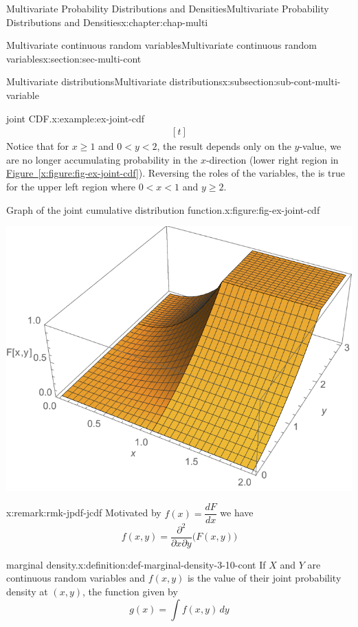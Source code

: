 \documentclass[oneside,10pt,]{book}
\newcommand{\xreffont}{\relax}
\numberwithin{equation}{section}
\newcommand{\lt}{<}
\begin{document}
\begin{chapterptx}{Multivariate Probability Distributions and Densities}{}{Multivariate Probability Distributions and Densities}{}{}{x:chapter:chap-multi}
\begin{sectionptx}{Multivariate continuous random variables}{}{Multivariate continuous random variables}{}{}{x:section:sec-multi-cont}
\begin{subsectionptx}{Multivariate distributions}{}{Multivariate distributions}{}{}{x:subsection:sub-cont-multi-variable}
\begin{example}{joint CDF.}{x:example:ex-joint-cdf}
\begin{equation*}
\begin{aligned}[t]
\end{aligned}
\end{equation*}
Notice that for \(x \ge 1\) and \(0 \lt y \lt 2\), the result depends only on the \(y\)-value, we are no longer accumulating probability in the \(x\)-direction (lower right region in \hyperref[x:figure:fig-ex-joint-cdf]{Figure~{\xreffont\ref{x:figure:fig-ex-joint-cdf}}}).  Reversing the roles of the variables, the is true for the upper left region where \(0 \lt x \lt 1\) and \(y \ge 2\). \begin{figureptx}{Graph of the joint cumulative distribution function.}{x:figure:fig-ex-joint-cdf}{}%
\begin{image}{0.25}{0.5}{0.25}%
\includegraphics[width=\linewidth]{./images/big_F.png}
\end{image}%
\tcblower
\end{figureptx}%
\end{example}
\begin{remark}{}{x:remark:rmk-jpdf-jcdf}%
Motivated by \(f(x) = \dfrac{dF}{dx}\) we have%
\begin{equation*}
f(x, y) = \dfrac{\partial^2}{\partial x \partial y}\Big(F(x, y)\Big)
\end{equation*}
%
\end{remark}
\begin{definition}{marginal density.}{x:definition:def-marginal-density-3-10-cont}%
If \(X\) and \(Y\) are continuous random variables and \(f(x,
y)\) is the value of their joint probability density at \((x, y)\), the function given by%
\begin{equation*}
g(x) = \int f(x, y)\, dy

\end{equation*}
\end{definition}
\end{subsectionptx}
\end{sectionptx}
\end{chapterptx}
\end{document}
